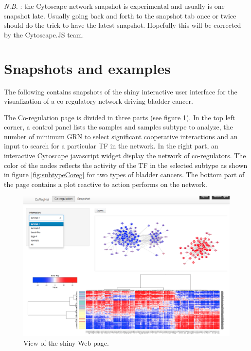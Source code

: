 \documentclass[12pt]{article}
\begin{document}
\textit{N.B.} : the Cytoscape network snapshot is experimental and usually is
one snapshot late. Usually going back and forth to the snapshot tab once
or twice should do the trick to have the latest snapshot. Hopefully this
will be corrected by the Cytoscape.JS team.


\newpage



\section{Snapshots and examples}



The following contains snapshots of the shiny interactive user interface for the visualization of a co-regulatory network driving  bladder cancer.


The Co-regulation page is divided in three parts (see figure \ref{fig:webpage}).
In the top left corner, a control panel lists the samples and samples subtype to analyze, the number of minimum GRN to select significant cooperative interactions and an input to search for a particular TF in the network.
In the right part, an interactive Cytoscape javascript widget display the network of co-regulators. The color of the nodes reflects the activity of the TF in the selected subtype as shown in figure \ref{fig:subtypeCoreg} for two types of bladder cancers.
The bottom part of the page contains a plot reactive to action performs on the network.

\begin{figure}[h]
\caption{View of the shiny Web page.}
\label{fig:webpage}
\includegraphics{fig/wholeApp}
\end{figure}
\end{document}
